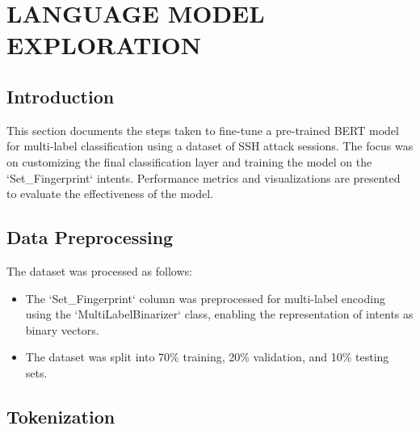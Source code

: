 

\section{LANGUAGE MODEL EXPLORATION}


    \subsection{Introduction}
    
        This section documents the steps taken to fine-tune a pre-trained BERT model for multi-label classification using a dataset of SSH attack sessions.
        The focus was on customizing the final classification layer and training the model on the `Set\_Fingerprint` intents. Performance metrics and visualizations are presented to evaluate the effectiveness of the model.

    \subsection{Data Preprocessing}
    
        The dataset was processed as follows:
        
        \begin{itemize}
        
            \item The `Set\_Fingerprint` column was preprocessed for multi-label encoding using the `MultiLabelBinarizer` class, enabling the representation of intents as binary vectors.
            
            \item The dataset was split into 70\% training, 20\% validation, and 10\% testing sets.
            
        \end{itemize}

    \subsection{Tokenization}
    
